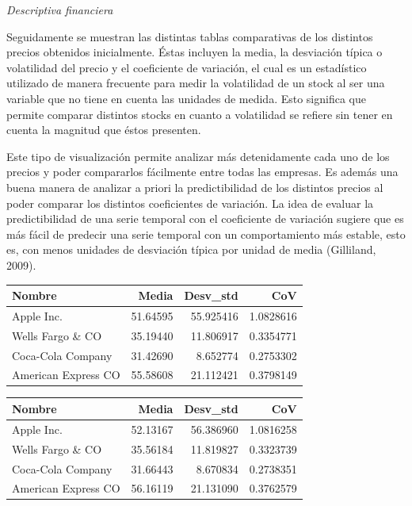 \documentclass[]{DissertateUSU}
\begin{document}
\emph{Descriptiva financiera}

\noindent Seguidamente se muestran las distintas tablas comparativas de
los distintos precios obtenidos inicialmente. Éstas incluyen la media,
la desviación típica o volatilidad del precio y el coeficiente de
variación, el cual es un estadístico utilizado de manera frecuente para
medir la volatilidad de un stock al ser una variable que no tiene en
cuenta las unidades de medida. Esto significa que permite comparar
distintos stocks en cuanto a volatilidad se refiere sin tener en cuenta
la magnitud que éstos presenten.

\noindent Este tipo de visualización permite analizar más detenidamente
cada uno de los precios y poder compararlos fácilmente entre todas las
empresas. Es además una buena manera de analizar a priori la
predictibilidad de los distintos precios al poder comparar los distintos
coeficientes de variación. La idea de evaluar la predictibilidad de una
serie temporal con el coeficiente de variación sugiere que es más fácil
de predecir una serie temporal con un comportamiento más estable, esto
es, con menos unidades de desviación típica por unidad de media
(Gilliland, 2009).

\begin{table}[H]
\centering\begingroup\fontsize{10}{12}\selectfont

\begin{tabular}{l|r|r|r}
\hline
Nombre & Media & Desv\_std & CoV\\
\hline
Apple Inc. & 51.64595 & 55.925416 & 1.0828616\\
\hline
Wells Fargo \& CO & 35.19440 & 11.806917 & 0.3354771\\
\hline
Coca-Cola Company & 31.42690 & 8.652774 & 0.2753302\\
\hline
American Express CO & 55.58608 & 21.112421 & 0.3798149\\
\hline
\end{tabular}
\endgroup{}
\end{table}
\centering

\begin{table}[H]
\centering\begingroup\fontsize{10}{12}\selectfont

\begin{tabular}{l|r|r|r}
\hline
Nombre & Media & Desv\_std & CoV\\
\hline
Apple Inc. & 52.13167 & 56.386960 & 1.0816258\\
\hline
Wells Fargo \& CO & 35.56184 & 11.819827 & 0.3323739\\
\hline
Coca-Cola Company & 31.66443 & 8.670834 & 0.2738351\\
\hline
American Express CO & 56.16119 & 21.131090 & 0.3762579\\
\hline
\end{tabular}
\endgroup{}
\end{table}
\centering
\end{document}
